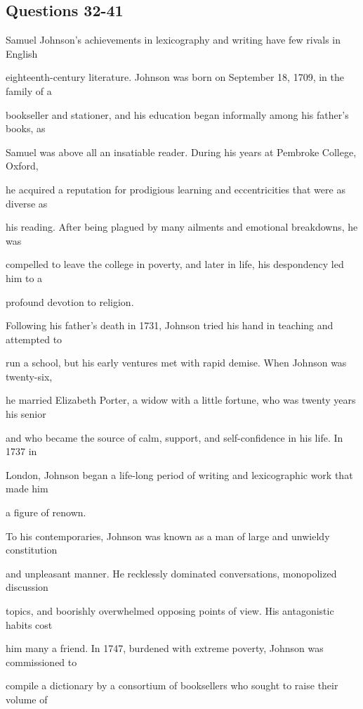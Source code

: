 \documentclass[12pt]{article}
\begin{document}
\subsection*{Questions 32-41}
\begingroup
\small
\sloppy
\setlength{\parskip}{0pt}
\setlength{\parindent}{0pt}
Samuel Johnson's achievements in lexicography and writing have few rivals in English\par
eighteenth-century literature. Johnson was born on September 18, 1709, in the family of a\par
bookseller and stationer, and his education began informally among his father's books, as\par
Samuel was above all an insatiable reader. During his years at Pembroke College, Oxford,\par
he acquired a reputation for prodigious learning and eccentricities that were as diverse as\par
his reading. After being plagued by many ailments and emotional breakdowns, he was\par
compelled to leave the college in poverty, and later in life, his despondency led him to a\par
profound devotion to religion.\par
Following his father's death in 1731, Johnson tried his hand in teaching and attempted to\par
run a school, but his early ventures met with rapid demise. When Johnson was twenty-six,\par
he married Elizabeth Porter, a widow with a little fortune, who was twenty years his senior\par
and who became the source of calm, support, and self-confidence in his life. In 1737 in\par
London, Johnson began a life-long period of writing and lexicographic work that made him\par
a figure of renown.\par
To his contemporaries, Johnson was known as a man of large and unwieldy constitution\par
and unpleasant manner. He recklessly dominated conversations, monopolized discussion\par
topics, and boorishly overwhelmed opposing points of view. His antagonistic habits cost\par
him many a friend. In 1747, burdened with extreme poverty, Johnson was commissioned to\par
compile a dictionary by a consortium of booksellers who sought to raise their volume of\par
\end{document}
